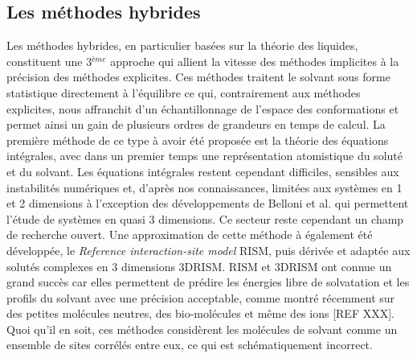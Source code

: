 \subsection{Les méthodes hybrides}
Les méthodes hybrides, en particulier basées sur la théorie des liquides, constituent une 3$^{ème}$ approche qui allient la vitesse des méthodes implicites à la précision des méthodes explicites. Ces méthodes traitent le solvant sous forme statistique directement à l'équilibre ce qui, contrairement aux méthodes explicites, nous affranchit d'un échantillonnage de l'espace des conformations et permet ainsi un gain de plusieurs ordres de grandeurs en temps de calcul. La première méthode de ce type à avoir été proposée est la théorie des équations intégrales, avec dans un premier temps une représentation atomistique du soluté et du solvant. Les équations intégrales restent cependant difficiles, sensibles aux instabilités numériques et, d'après nos connaissances, limitées aux systèmes en 1 et 2 dimensions à l'exception des développements de Belloni et al.\cite{Puibasset_bridge_2012, belloni_unpublished} qui permettent l'étude de systèmes en quasi 3 dimensions. Ce secteur reste cependant un champ de recherche ouvert. Une approximation de cette méthode à également été développée, le \textit{Reference interaction-site model} RISM, puis dérivée et adaptée aux solutés complexes en 3 dimensions 3DRISM\cite{Chandler_censity_1986,Kovalenko_self_1999}. RISM et 3DRISM ont connue un grand succès car elles permettent de prédire les énergies libre de solvatation et les profils du solvant avec une précision acceptable, comme montré récemment sur des petites molécules neutres, des bio-molécules et même des ions [REF XXX]. Quoi qu'il en soit, ces méthodes considèrent les molécules de solvant comme un ensemble de sites corrélés entre eux, ce qui est schématiquement incorrect.


